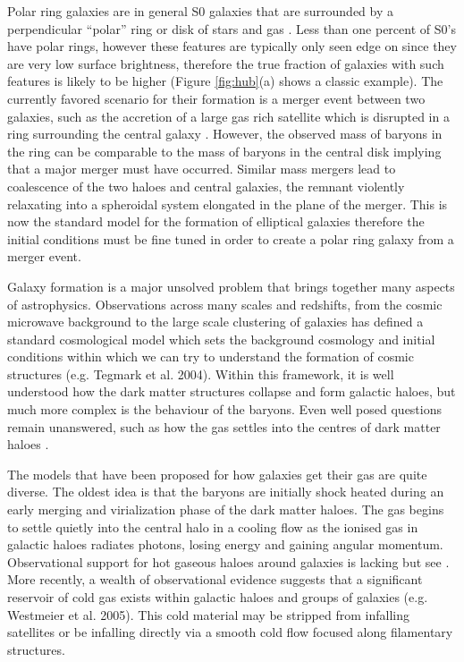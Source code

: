 \documentclass[preprint]{aastex}
\begin{document}
Polar ring galaxies are in general S0 galaxies that are surrounded
by a perpendicular ``polar'' ring or disk of stars and gas
\citep{Schweizer1983,Sparke1986,Whitmore1987,Whitmore1990,Rubin1994}. Less than one percent
of S0's have polar rings, however these features are typically only seen edge on since they
are very low surface brightness, therefore the true fraction of galaxies with
such features is likely to be higher (Figure \ref{fig:hub}(a) shows a classic example).
The currently favored scenario for their formation is a 
merger event between two galaxies, such as the accretion of a large gas
rich satellite which is disrupted in a ring surrounding the central galaxy
\citep{Schweizer1983,Reshetnikov1997,Bekki1998,Tremaine2000,Sparke2000,Bournaud2003}. 
However, the observed mass of baryons in the ring can be comparable to the mass of baryons
in the central disk implying that a major merger must have occurred. 
Similar mass mergers lead to coalescence of the two haloes and central galaxies, 
the remnant violently relaxating into a spheroidal system elongated in the plane of the merger. 
This is now the standard model
for the formation of elliptical galaxies \citep{Toomre1972,Gerhard1981,Barnes1996,BurkertNaab}
therefore the initial conditions must be fine tuned in order to create a polar ring 
galaxy from a merger event.

Galaxy formation is a major unsolved problem that brings together many aspects 
of astrophysics. Observations across many scales and redshifts,
from the cosmic microwave background to the large scale clustering 
of galaxies has defined a standard cosmological model which sets the background
cosmology and initial conditions within which we can try to understand the formation
of cosmic structures (e.g. Tegmark et al. 2004). Within this framework, it is well understood
how the dark matter structures collapse and form galactic haloes,
but much more complex is the behaviour of the baryons. 
Even well posed questions remain unanswered, such as how the gas settles into
the centres of dark matter haloes \citep{Hoyle1953,Dekel2003,Katz03,Keres2005}.

The models that have been proposed for how galaxies get their gas are quite diverse. 
The oldest idea is that the baryons are initially shock heated during an early
merging and virialization phase of the dark matter haloes. The gas begins to 
settle quietly into the central halo in a cooling
flow as the ionised gas in galactic haloes radiates photons, losing energy and gaining
angular momentum. Observational support for hot gaseous haloes around galaxies is lacking 
\citep{Benson2003} but see \citep{tobias05,Mo2005}.
More recently, a wealth of observational evidence suggests that a significant
reservoir of cold gas exists within galactic haloes and groups of galaxies 
(e.g. Westmeier et al. 2005). This cold
material may be stripped from infalling satellites or be infalling directly 
via a smooth cold flow focused along filamentary structures. 
\end{document}
